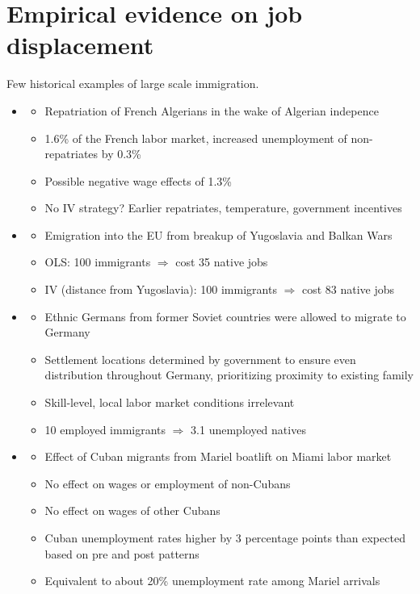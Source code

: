 \documentclass[12pt]{article}
\begin{document}
\section{Empirical evidence on job displacement}
Few historical examples of large scale immigration.

\begin{itemize}
    \item \textcite{hunt_ILRReview_1992_algerian_repatriates_french_labor_market}
    \begin{itemize}
        \item Repatriation of French Algerians in the wake of Algerian indepence
        \item 1.6\% of the French labor market, increased unemployment of non-repatriates by 0.3\%
        \item Possible negative wage effects of 1.3\%
        \item No IV strategy? Earlier repatriates, temperature, government incentives
    \end{itemize}
    \item \textcite{angrist_kugler_EJ_2003_yugoslovia_immigration}
    \begin{itemize}
        \item Emigration into the EU from breakup of Yugoslavia and Balkan Wars
        \item OLS: 100 immigrants $\Rightarrow$ cost 35 native jobs
        \item IV (distance from Yugoslavia): 100 immigrants $\Rightarrow$ cost 83 native jobs
    \end{itemize}
    \item \textcite{glits_JOLE_2012_soviet_german_immigrants_allocation_rule}
    \begin{itemize}
        \item Ethnic Germans from former Soviet countries were allowed to migrate to Germany
        \item Settlement locations determined by government to ensure even distribution throughout Germany, prioritizing proximity to existing family
        \item Skill-level, local labor market conditions irrelevant
        \item 10 employed immigrants $\Rightarrow$ 3.1 unemployed natives
    \end{itemize}
    \item \textcite{card_ILRReview_1990_mariel_boatlift}
    \begin{itemize}
        \item Effect of Cuban migrants from Mariel boatlift on Miami labor market
        \item No effect on wages or employment of non-Cubans
        \item No effect on wages of other Cubans
        \item Cuban unemployment rates higher by 3 percentage points than expected based on pre and post patterns
        \item Equivalent to about 20\% unemployment rate among Mariel arrivals
    \end{itemize}
\end{itemize}
\end{document}
